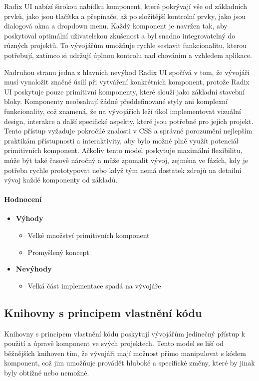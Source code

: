 Radix UI nabízí širokou nabídku komponent, které pokrývají vše od základních prvků, jako jsou tlačítka a přepínače, až po složitější kontrolní prvky, jako jsou dialogová okna a dropdown menu. Každý komponent je navržen tak, aby poskytoval optimální uživatelskou zkušenost a byl snadno integrovatelný do různých projektů. To vývojářům umožňuje rychle sestavit funkcionalitu, kterou potřebují, zatímco si udržují úplnou kontrolu nad chováním a vzhledem aplikace.

Nadruhou stranu jedna z hlavních nevýhod Radix UI spočívá v tom, že vývojáři musí vynaložit značné úsilí při vytváření konkrétních komponent, protože Radix UI poskytuje pouze primitivní komponenty, které slouží jako základní stavební bloky. Komponenty neobsahují žádné předdefinované styly ani komplexní funkcionality, což znamená, že na vývojářích leží úkol implementovat vizuální design, interakce a další specifické aspekty, které jsou potřebné pro jejich projekt. Tento přístup vyžaduje pokročilé znalosti v CSS a správné porozumění nejlepším praktikám přístupnosti a interaktivity, aby bylo možné plně využít potenciál primitivních komponent. Ačkoliv tento model poskytuje maximální flexibilitu, může být také časově náročný a může zpomalit vývoj, zejména ve fázích, kdy je potřeba rychle prototypovat nebo když tým nemá dostatek zdrojů na detailní vývoj každé komponenty od základů.

\paragraph{Hodnocení}

\begin{itemize}
    \item \textbf{Výhody}
    \begin{itemize}
        \item Velké množství primitivních komponent
        \item Promyšlený koncept
    \end{itemize}
    \item \textbf{Nevýhody}
    \begin{itemize}
        \item Velká část implementace spadá na vývojáře
    \end{itemize}
\end{itemize}

\subsection{Knihovny s principem vlastnění kódu}
Knihovny s principem vlastnění kódu poskytují vývojářům jedinečný přístup k použití a úpravě komponent ve svých projektech. Tento model se liší od běžnějších knihoven tím, že vývojáři mají možnost přímo manipulovat s kódem komponent, což jim umožňuje provádět hluboké a specifické změny, které by jinak byly obtížné nebo nemožné.

